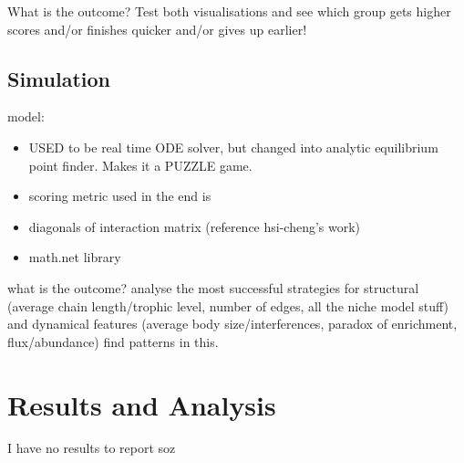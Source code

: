 What is the outcome? Test both visualisations and see which group gets higher scores and/or finishes quicker and/or gives up earlier!

\subsection{Simulation}
model:
\begin{itemize}
  \item USED to be real time ODE solver, but changed into analytic equilibrium point finder. Makes it a PUZZLE game.
  \item scoring metric used in the end is 
  \item diagonals of interaction matrix (reference hsi-cheng's work)
  \item math.net library
\end{itemize}

what is the outcome? analyse the most successful strategies for structural (average chain length/trophic level, number of edges, all the niche model stuff) and dynamical features (average body size/interferences, paradox of enrichment, flux/abundance)
find patterns in this.

\section{Results and Analysis}

I have no results to report soz